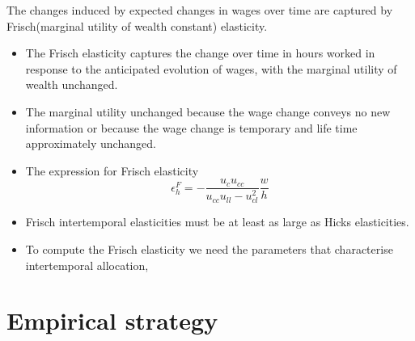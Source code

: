 The changes induced by expected changes in wages over time are captured by Frisch(marginal utility of wealth constant) elasticity.

\begin{itemize}
    \item The Frisch elasticity captures the change over time in hours worked in response to the anticipated evolution of wages, with the marginal utility of wealth unchanged.
    \item The marginal utility unchanged because the wage change conveys no new information or because the wage change is temporary and life time approximately unchanged.
    \item The expression for Frisch elasticity \[ \epsilon_h^F = - \frac{u_c u_{cc}}{u_{cc} u_{ll} - u_{cl}^2} \frac{w}{h} \]
    \item Frisch intertemporal elasticities must be at least as large as Hicks elasticities.
    \item To compute the Frisch elasticity we need the parameters that characterise intertemporal allocation,
\end{itemize}

\section{Empirical strategy}
